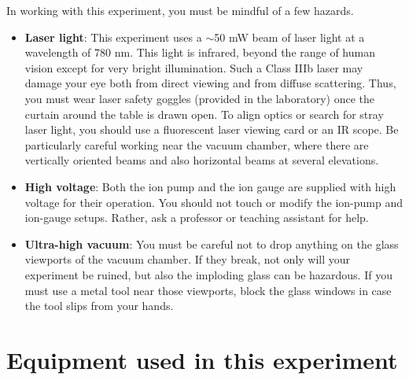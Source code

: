 \documentclass{../lab}
\begin{document}
In working with this experiment, you must be mindful of a few hazards.

\begin{itemize}
    \item \textbf{Laser light}: This experiment uses a $\sim$50 mW beam of laser light at a wavelength of 780 nm. This light is infrared, beyond the range of human vision except for very bright illumination. Such a Class IIIb laser may damage your eye both from direct viewing and from diffuse scattering. Thus, you must wear laser safety goggles (provided in the laboratory) once the curtain around the table is drawn open. To align optics or search for stray laser light, you should use a fluorescent laser viewing card or an IR scope. Be particularly careful working near the vacuum chamber, where there are vertically oriented beams and also horizontal beams at several elevations.

    \item \textbf{High voltage}: Both the ion pump and the ion gauge are supplied with high voltage for their operation.  You should not touch or modify the ion-pump and ion-gauge setups.  Rather, ask a professor or teaching assistant for help.

    \item \textbf{Ultra-high vacuum}: You must be careful not to drop anything on the glass viewports of the vacuum chamber. If they break, not only will your experiment be ruined, but also the imploding glass can be hazardous. If you must use a metal tool near those viewports, block the glass windows in case the tool slips from your hands.
\end{itemize}

\section{Equipment used in this experiment}
\end{document}
